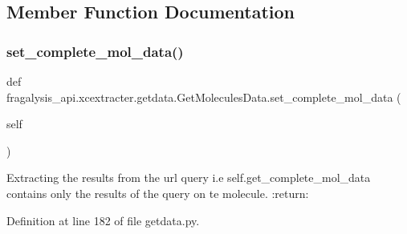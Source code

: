 \subsection{Member Function Documentation}
\mbox{\label{classfragalysis__api_1_1xcextracter_1_1getdata_1_1_get_molecules_data_a5bf2f4562196e169f76aa30cdcd9029d}} 
\subsubsection{\texorpdfstring{set\+\_\+complete\+\_\+mol\+\_\+data()}{set\_complete\_mol\_data()}}
{\footnotesize\ttfamily def fragalysis\+\_\+api.\+xcextracter.\+getdata.\+Get\+Molecules\+Data.\+set\+\_\+complete\+\_\+mol\+\_\+data (\begin{DoxyParamCaption}\item[{}]{self }\end{DoxyParamCaption})}

\begin{DoxyVerb}Extracting the results from the url query
i.e self.get_complete_mol_data contains only
the results of the query on te molecule.
:return:
\end{DoxyVerb}
 

Definition at line 182 of file getdata.\+py.


